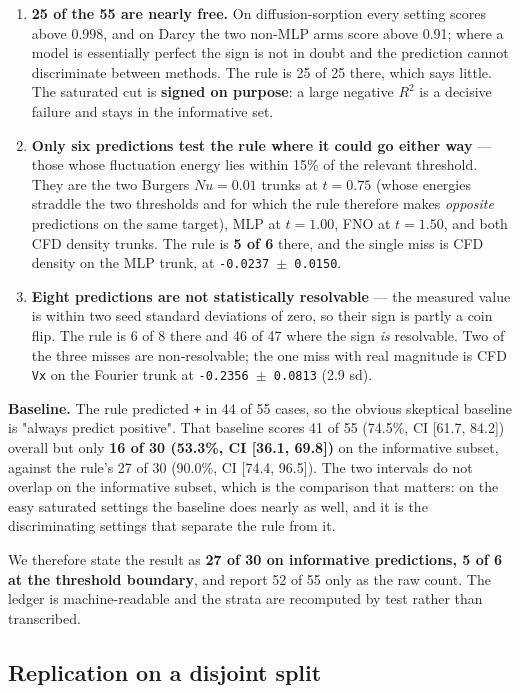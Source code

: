 \documentclass[preprint,12pt]{elsarticle}
\begin{document}
\begin{enumerate}
\item \textbf{25 of the 55 are nearly free.} On diffusion-sorption every setting scores above 0.998, and on Darcy the two non-MLP arms score above 0.91; where a model is essentially perfect the sign is not in doubt and the prediction cannot discriminate between methods. The rule is 25 of 25 there, which says little. The saturated cut is \textbf{signed on purpose}: a large negative $R^2$ is a decisive failure and stays in the informative set.
\item \textbf{Only six predictions test the rule where it could go either way} --- those whose fluctuation energy lies within 15\% of the relevant threshold. They are the two Burgers $Nu = 0.01$ trunks at $t = 0.75$ (whose energies straddle the two thresholds and for which the rule therefore makes \emph{opposite} predictions on the same target), MLP at $t = 1.00$, FNO at $t = 1.50$, and both CFD density trunks. The rule is \textbf{5 of 6} there, and the single miss is CFD density on the MLP trunk, at \texttt{-0.0237 $\pm$ 0.0150}.
\item \textbf{Eight predictions are not statistically resolvable} --- the measured value is within two seed standard deviations of zero, so their sign is partly a coin flip. The rule is 6 of 8 there and 46 of 47 where the sign \emph{is} resolvable. Two of the three misses are non-resolvable; the one miss with real magnitude is CFD \texttt{Vx} on the Fourier trunk at \texttt{-0.2356 $\pm$ 0.0813} (2.9 sd).
\end{enumerate}


\textbf{Baseline.} The rule predicted \texttt{+} in 44 of 55 cases, so the obvious skeptical baseline is "always predict positive". That baseline scores 41 of 55 (74.5\%, CI [61.7, 84.2]) overall but only \textbf{16 of 30 (53.3\%, CI [36.1, 69.8])} on the informative subset, against the rule's 27 of 30 (90.0\%, CI [74.4, 96.5]). The two intervals do not overlap on the informative subset, which is the comparison that matters: on the easy saturated settings the baseline does nearly as well, and it is the discriminating settings that separate the rule from it.

We therefore state the result as \textbf{27 of 30 on informative predictions, 5 of 6 at the threshold boundary}, and report 52 of 55 only as the raw count. The ledger is machine-readable and the strata are recomputed by test rather than transcribed.

\subsection{Replication on a disjoint split}
\end{document}
